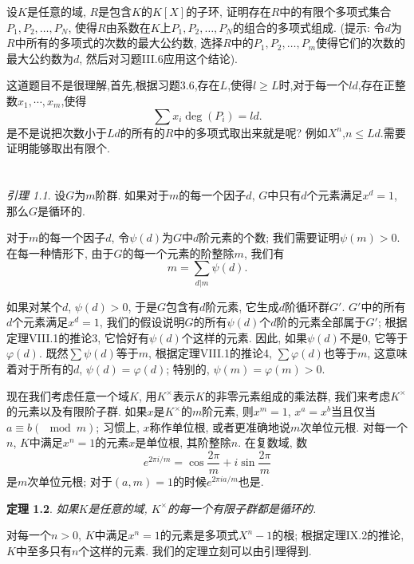 \documentclass[12pt,a4paper]{book} %
\newtheorem{theorem}{定理}
\theoremstyle{remark}
\theoremstyle{example}
\theoremstyle{lemma}
\newtheorem{lemma}[theorem]{引理}
\theoremstyle{corollary}
\numberwithin{theorem}{chapter}
\begin{document}
\begin{enumerate}
设$K$是任意的域, $R$是包含$K$的$K[X]$的子环, 证明存在$R$中的有限个多项式集合$P_1, P_2, \ldots, P_N$, 使得$R$由系数在$K$上$P_1, P_2, \ldots, P_N$的组合的多项式组成. (提示: 令$d$为$R$中所有的多项式的次数的最大公约数, 选择$R$中的$P_1, P_2, \ldots, P_m$使得它们的次数的最大公约数为$d$, 然后对习题III.6应用这个结论).

这道题目不是很理解,首先,根据习题3.6,存在$L$,使得$l \ge L$时,对于每一个$ld$,存在正整数$x_1,\cdots,x_m$,使得
\[
\sum{x_i\deg(P_i)}=ld.
\]
是不是说把次数小于$Ld$的所有的$R$中的多项式取出来就是呢? 例如$X^n$,$n \le Ld$.需要证明能够取出有限个.

\end{enumerate}

\chapter{} \label{chapter:10}
\begin{lemma}
设$G$为$m$阶群. 如果对于$m$的每一个因子$d$, $G$中只有$d$个元素满足$x^d = 1$, 那么$G$是循环的.
\end{lemma}

对于$m$的每一个因子$d$, 令$\psi(d)$为$G$中$d$阶元素的个数; 我们需要证明$\psi(m) > 0$. 在每一种情形下, 由于$G$的每一个元素的阶整除$m$, 我们有
\[
m = \sum_{d | m}{\psi(d)}.
\]

如果对某个$d$, $\psi(d) > 0$, 于是$G$包含有$d$阶元素, 它生成$d$阶循环群$G'$. $G'$中的所有$d$个元素满足$x^d = 1$, 我们的假设说明$G$的所有$\psi(d)$个$d$阶的元素全部属于$G'$; 根据定理VIII.1的推论3, 它恰好有$\psi(d)$个这样的元素. 因此, 如果$\psi(d)$不是0, 它等于$\varphi(d)$. 既然$\sum{\psi(d)}$等于$m$, 根据定理VIII.1的推论4, $\sum{\varphi(d)}$也等于$m$, 这意味着对于所有的$d$, $\psi(d) = \varphi(d)$; 特别的, $\psi(m) = \varphi(m) > 0$.

现在我们考虑任意一个域$K$, 用$K^{\times}$表示$K$的非零元素组成的乘法群, 我们来考虑$K^{\times}$的元素以及有限阶子群. 如果$x$是$K^{\times}$的$m$阶元素, 则$x^{m} = 1$, $x^a = x^b$当且仅当$a \equiv b (\mod m)$; 习惯上, $x$称作单位根, 或者更准确地说$m$次单位元根. 对每一个$n$, $K$中满足$x^n = 1$的元素$x$是单位根, 其阶整除$n$. 在复数域, 数
\[
e^{2 \pi i / m} = \cos{\frac{2\pi}{m}} + i \sin{\frac{2 \pi}{m}}
\]
是$m$次单位元根; 对于$(a, m) = 1$的时候$e^{2 \pi ia / m}$也是.

\begin{theorem}
如果$K$是任意的域, $K^{\times}$的每一个有限子群都是循环的.
\end{theorem}

对每一个$n > 0$, $K$中满足$x^n = 1$的元素是多项式$X^n - 1$的根; 根据定理IX.2的推论, $K$中至多只有$n$个这样的元素. 我们的定理立刻可以由引理得到.
\end{document}

